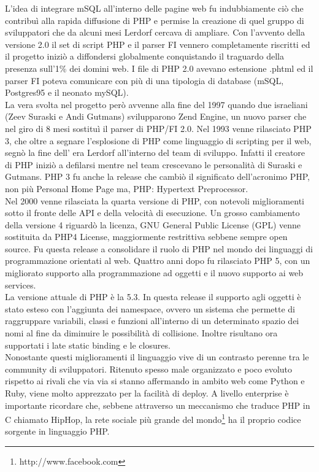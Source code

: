 L'idea di integrare mSQL all’interno delle pagine web fu indubbiamente ciò che contribuì alla rapida diffusione di PHP e permise la creazione di quel gruppo di sviluppatori che da alcuni mesi Lerdorf cercava di ampliare.
Con l’avvento della versione 2.0 il set di script PHP e il parser FI vennero completamente riscritti ed il progetto iniziò a diffondersi globalmente conquistando il traguardo della presenza sull’1\% dei domini web. I file di PHP 2.0 avevano estensione .phtml ed il parser FI poteva comunicare con più di una tipologia di database (mSQL, Postgres95 e il neonato mySQL).\\
La vera svolta nel progetto però avvenne alla fine del 1997 quando due israeliani (Zeev Suraski e Andi Gutmans) svilupparono Zend Engine, un nuovo parser che nel giro di 8 mesi sostituì il parser di PHP/FI 2.0. Nel 1993 venne rilasciato PHP 3, che oltre a segnare l’esplosione di PHP come linguaggio di scripting per il web, segnò la fine dell’ era Lerdorf all’interno del team di sviluppo. Infatti il creatore di PHP iniziò a defilarsi mentre nel team crescevano le personalità di Suraski e Gutmans. PHP 3 fu anche la release che cambiò il significato dell'acronimo PHP, non più Personal Home Page ma, PHP: Hypertext Preprocessor.\\
Nel 2000 venne rilasciata la quarta versione di PHP, con notevoli miglioramenti sotto il fronte delle API e della velocità di esecuzione. Un grosso cambiamento della versione 4 riguardò la licenza, GNU General Public License (GPL) venne sostituita da PHP4 License, maggiormente restrittiva sebbene sempre open source. Fu questa release a consolidare il ruolo di PHP nel mondo dei linguaggi di programmazione orientati al web. Quattro anni dopo fu rilasciato PHP 5, con un migliorato supporto alla programmazione ad oggetti e il nuovo supporto ai web services.\\
La versione attuale di PHP è la 5.3. In questa release il supporto agli oggetti è stato esteso con l'aggiunta dei namespace, ovvero un sistema che permette di raggruppare variabili, classi e funzioni all’interno di un determinato spazio dei nomi al fine da diminuire le possibilità di collisione. Inoltre risultano ora supportati i late static binding e le closures.\\
Nonostante questi miglioramenti il linguaggio vive di un contrasto perenne tra le community di sviluppatori. Ritenuto spesso male organizzato e poco evoluto rispetto ai rivali che via via si stanno affermando in ambito web come Python e Ruby, viene molto apprezzato per la facilità di deploy. A livello enterprise è importante ricordare che, sebbene attraverso un meccanismo che traduce PHP in C chiamato HipHop, la rete sociale più grande del mondo\footnote{http://www.facebook.com} ha il proprio codice sorgente in linguaggio PHP.

